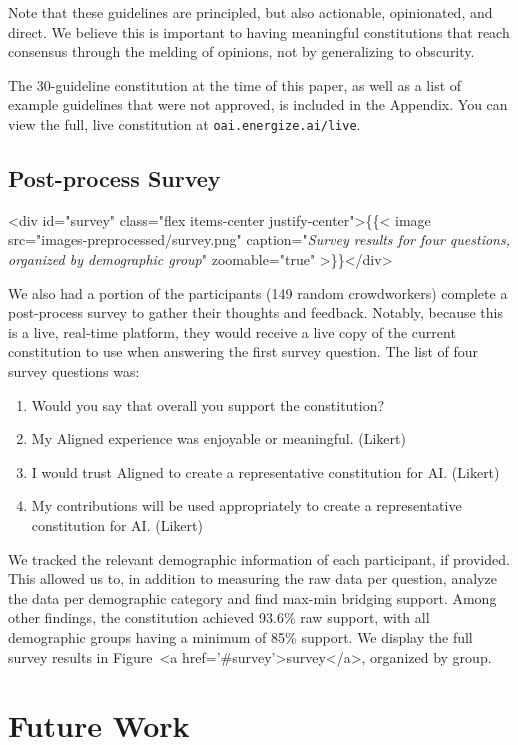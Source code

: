 \documentclass{article}
\begin{document}
\begin{multicols}{2}
Note that these guidelines are principled, but also actionable, opinionated, and direct. We believe this is important to having meaningful constitutions that reach consensus through the melding of opinions, not by generalizing to obscurity.

The 30-guideline constitution at the time of this paper, as well as a list of example guidelines that were not approved, is included in the Appendix. You can view the full, live constitution at \texttt{oai.energize.ai/live}.

\subsection{Post-process Survey}

<div id="survey" class="flex items-center justify-center">\{\{< image src="images-preprocessed/survey.png" caption="\textit{Survey results for four questions, organized by demographic group}" zoomable="true" >\}\}</div>



We also had a portion of the participants (149 random crowdworkers) complete a post-process survey to gather their thoughts and feedback. Notably, because this is a live, real-time platform, they would receive a live copy of the current constitution to use when answering the first survey question. The list of four survey questions was:
\begin{enumerate}
\item Would you say that overall you support the constitution?
\item My Aligned experience was enjoyable or meaningful. (Likert)
\item I would trust Aligned to create a representative constitution for AI. (Likert)
\item My contributions will be used appropriately to create a representative constitution for AI. (Likert)
\end{enumerate}

We tracked the relevant demographic information of each participant, if provided. This allowed us to, in addition to measuring the raw data per question, analyze the data per demographic category and find max-min bridging support. Among other findings, the constitution achieved 93.6\% raw support, with all demographic groups having a minimum of 85\% support. We display the full survey results in Figure~<a href='#survey'>survey</a>, organized by group.

\section{Future Work}


\end{multicols}
\end{document}
